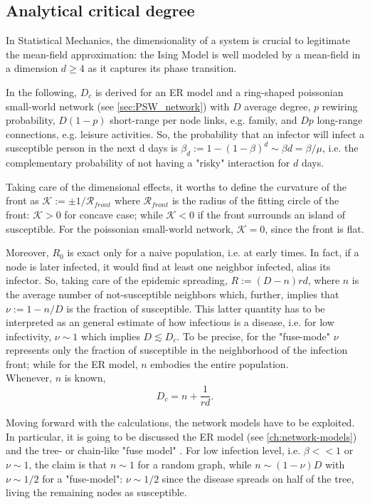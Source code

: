 \documentclass[a4paper,12pt,twoside]{book} %
\theoremstyle{definition}
\begin{document}
\subsection*{Analytical critical degree}
In Statistical Mechanics, the dimensionality of a system is crucial to legitimate the mean-field approximation: the Ising Model is well modeled by a mean-field in a dimension $d \geq 4$ as it captures its phase transition.

In the following, $D_c$ is derived for an ER model and a ring-shaped poissonian small-world network (see \autoref{sec:PSW_network}) with $D$ average degree, $p$ rewiring probability, $D(1-p)$ short-range per node links, e.g. family, and $Dp$ long-range connections, e.g. leisure activities. So, the probability that an infector will infect a susceptible person in the next d days is $\beta_d:= 1-(1-\beta)^d \sim \beta d = \beta/\mu$, i.e. the complementary probability of not having a "risky" interaction for $d$ days.

Taking care of the dimensional effects, it worths to define the curvature of the front as $ \mathcal{K}:= \pm 1/\mathcal{R}_{front}$ where $\mathcal{R}_{front}$ is the radius of the fitting circle of the front: $\mathcal{K}>0$ for concave case; while $\mathcal{K}<0$ if the front surrounds an island of susceptible. For the poissonian small-world network, $\mathcal{K} = 0$, since the front is flat.    

Moreover, $R_0$ is exact only for a naive population, i.e. at early times. In fact, if a node is later infected, it would find at least one neighbor infected, alias its infector. So, taking care of the epidemic spreading, $R := (D-n)rd$, where $n$ is the average number of not-susceptible neighbors which, further, implies that $\nu := 1 - n/D$ is the fraction of susceptible. This latter quantity has to be interpreted as an general estimate of how infectious is a disease, i.e. for low infectivity, $\nu\sim1$ which implies $D \lesssim D_c$.
To be precise, for the "fuse-mode" $\nu$ represents only the fraction of susceptible in the neighborhood of the infection front; while for the ER model, $n$ embodies the entire population.
\\Whenever, $n$ is known, 
\begin{equation}
	D_c = n + \frac{1}{rd}.
	\label{eq:D_c_analytical_discussion}
\end{equation}   

Moving forward with the calculations, the network models have to be exploited. In particular, it is going to be discussed the ER model (see \autoref{ch:network-models}) and the tree- or chain-like "fuse model" \cite{Thurner::NetBasedExpl}. For low infection level, i.e. $\beta<<1$ or $\nu\sim1$, the claim is that $n\sim 1$ for a random graph, while $n \sim (1-\nu)D$ with $\nu\sim 1/2$ for a "fuse-model": $\nu\sim 1/2$ since the disease spreads on half of the tree, living the remaining nodes as susceptible. 
\end{document}
